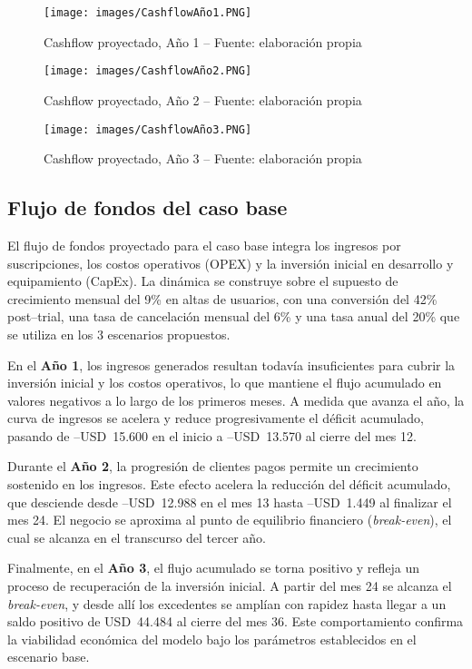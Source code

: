 \begin{figure}[!htbp]
  \centering
  \texttt{[image: images/CashflowAño1.PNG]}
  \caption{Cashflow proyectado, Año 1 -- Fuente: elaboración propia}
  \label{fig:cashflow-anio1}
\end{figure}

\begin{figure}[!htbp]
  \centering
  \texttt{[image: images/CashflowAño2.PNG]}
  \caption{Cashflow proyectado, Año 2 -- Fuente: elaboración propia}
  \label{fig:cashflow-anio2}
\end{figure}

\begin{figure}[!htbp]
  \centering
  \texttt{[image: images/CashflowAño3.PNG]}
  \caption{Cashflow proyectado, Año 3 -- Fuente: elaboración propia}
  \label{fig:cashflow-anio3}
\end{figure}


\subsection{Flujo de fondos del caso base}

El flujo de fondos proyectado para el caso base integra los ingresos por suscripciones, los costos operativos (OPEX) y la inversión inicial en desarrollo y equipamiento (CapEx). La dinámica se construye sobre el supuesto de crecimiento mensual del 9\% en altas de usuarios, con una conversión del 42\% post--trial, una tasa de cancelación mensual del 6\% y una tasa anual del 20\% que se utiliza en los 3 escenarios propuestos. 

En el \textbf{Año 1}, los ingresos generados resultan todavía insuficientes para cubrir la inversión inicial y los costos operativos, lo que mantiene el flujo acumulado en valores negativos a lo largo de los primeros meses. A medida que avanza el año, la curva de ingresos se acelera y reduce progresivamente el déficit acumulado, pasando de --USD~15.600 en el inicio a --USD~13.570 al cierre del mes 12.  

Durante el \textbf{Año 2}, la progresión de clientes pagos permite un crecimiento sostenido en los ingresos. Este efecto acelera la reducción del déficit acumulado, que desciende desde --USD~12.988 en el mes 13 hasta --USD~1.449 al finalizar el mes 24. El negocio se aproxima al punto de equilibrio financiero (\textit{break-even}), el cual se alcanza en el transcurso del tercer año.  

Finalmente, en el \textbf{Año 3}, el flujo acumulado se torna positivo y refleja un proceso de recuperación de la inversión inicial. A partir del mes 24 se alcanza el \textit{break-even}, y desde allí los excedentes se amplían con rapidez hasta llegar a un saldo positivo de USD~44.484 al cierre del mes 36. Este comportamiento confirma la viabilidad económica del modelo bajo los parámetros establecidos en el escenario base.  

